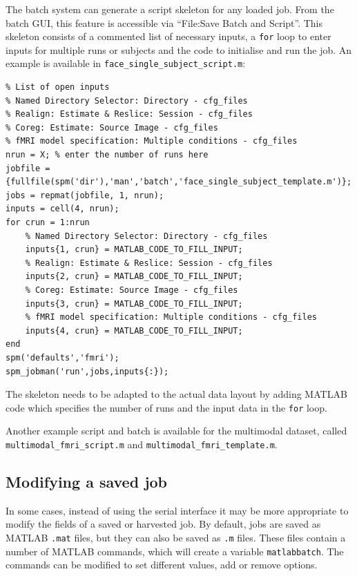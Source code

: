 The batch system can generate a script skeleton for any loaded
job. From the batch GUI, this feature is accessible via ``File:Save
Batch and Script''. This skeleton consists of a commented list of
necessary inputs, a \verb|for| loop to enter inputs for multiple runs
or subjects and the code to initialise and run the job. An example is
available in \verb|face_single_subject_script.m|:

\begin{verbatim}
% List of open inputs
% Named Directory Selector: Directory - cfg_files
% Realign: Estimate & Reslice: Session - cfg_files
% Coreg: Estimate: Source Image - cfg_files
% fMRI model specification: Multiple conditions - cfg_files
nrun = X; % enter the number of runs here
jobfile = {fullfile(spm('dir'),'man','batch','face_single_subject_template.m')};
jobs = repmat(jobfile, 1, nrun);
inputs = cell(4, nrun);
for crun = 1:nrun
    % Named Directory Selector: Directory - cfg_files
    inputs{1, crun} = MATLAB_CODE_TO_FILL_INPUT;
    % Realign: Estimate & Reslice: Session - cfg_files
    inputs{2, crun} = MATLAB_CODE_TO_FILL_INPUT; 
    % Coreg: Estimate: Source Image - cfg_files
    inputs{3, crun} = MATLAB_CODE_TO_FILL_INPUT; 
    % fMRI model specification: Multiple conditions - cfg_files
    inputs{4, crun} = MATLAB_CODE_TO_FILL_INPUT; 
end
spm('defaults','fmri');
spm_jobman('run',jobs,inputs{:});
\end{verbatim}

The skeleton needs to be adapted to the actual data layout by adding
MATLAB code which specifies the number of runs and the input data in
the \verb|for| loop.

Another example script and batch is available for the multimodal
dataset, called \verb|multimodal_fmri_script.m| and
\verb|multimodal_fmri_template.m|.

\subsection{Modifying a saved job}

In some cases, instead of using the serial interface it may be more
appropriate to modify the fields of a saved or harvested job. By default, jobs
are saved as MATLAB \verb|.mat| files, but they can also be saved as
\verb|.m| files. These files contain a number of MATLAB commands,
which will create a variable \verb|matlabbatch|. The commands can be
modified to set different values, add or remove options. 
